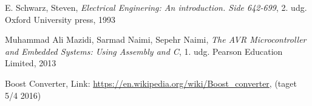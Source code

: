 \begin{thebibliography}{9}

  E. Schwarz, Steven,
  \emph{Electrical Enginering: An introduction. Side 642-699},
  2. udg.
  Oxford University press,
  1993

    Muhammad Ali Mazidi, Sarmad Naimi, Sepehr Naimi,
    \emph{The AVR Microcontroller and Embedded Systems: Using Assembly and C},
    1. udg.
    Pearson Education Limited,
    2013

      Boost Converter, Link:
    \url{https://en.wikipedia.org/wiki/Boost_converter},
      (taget 5/4 2016)

\end{thebibliography}
